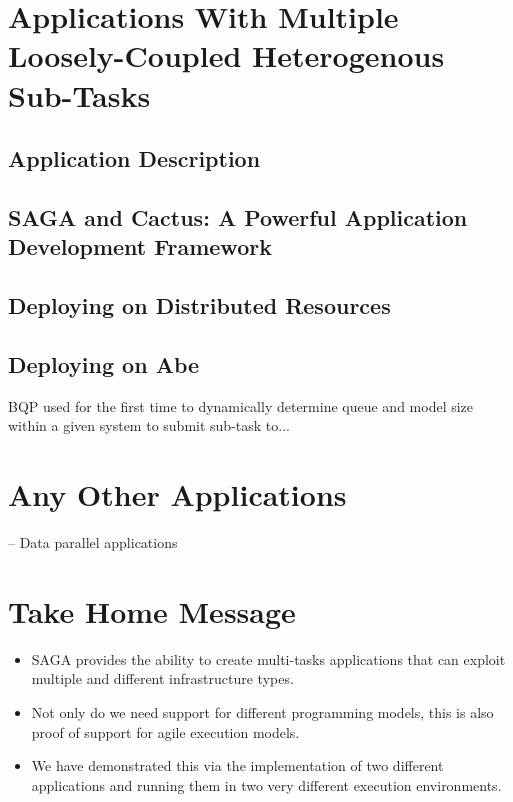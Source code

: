 \documentclass[conference,final]{IEEEtran}
\begin{document}
\section{Applications With Multiple Loosely-Coupled Heterogenous
Sub-Tasks}

\subsection{Application Description}

\subsection{SAGA and Cactus: A Powerful Application Development
  Framework}

\subsection{Deploying on Distributed Resources}

\subsection{Deploying on Abe}

BQP used for the first time to dynamically determine queue and model
size within a given system to submit sub-task to...


\section{Any Other Applications}

 -- Data parallel applications

\section{Take Home Message}

\begin{itemize}
\item  SAGA provides the ability to create multi-tasks applications that
  can exploit multiple and different infrastructure types.

\item Not only do we need support for different programming models, 
this is also proof of support for agile execution models.

\item We have demonstrated this via the implementation of two
  different applications and running them in two very different
  execution environments.
\end{itemize}
\end{document}
